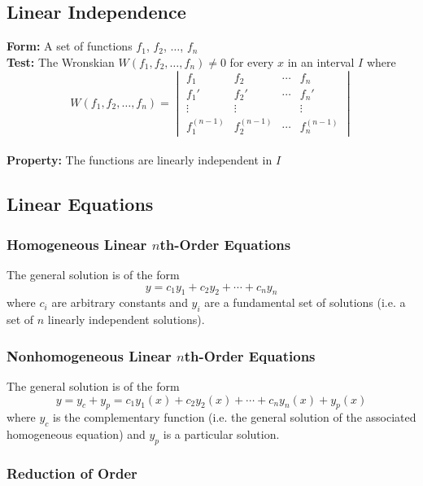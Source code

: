 \documentclass{article}
\begin{document}
\subsection{Linear Independence}

\textbf{Form:} A set of functions $f_1$, $f_2$, $\ldots$, $f_n$ \\ \textbf{Test:} The Wronskian $W(f_1, f_2, \ldots, f_n) \ne 0$ for every $x$ in an interval $I$ where \[W(f_1, f_2, \ldots, f_n) = \begin{vmatrix}
    f_1           & f_2           & \cdots & f_n           \\
    f_1'          & f_2'          & \cdots & f_n'          \\
    \vdots        & \vdots        &        & \vdots        \\
    f_1^{(n - 1)} & f_2^{(n - 1)} & \cdots & f_n^{(n - 1)}
  \end{vmatrix}\] \\ \textbf{Property:} The functions are linearly independent in $I$

\subsection{Linear Equations}

\subsubsection{Homogeneous Linear $n$th-Order Equations}

The general solution is of the form \[y = c_1 y_1 + c_2 y_2 + \cdots + c_n y_n\] where $c_i$ are arbitrary constants and $y_i$ are a fundamental set of solutions (i.e. a set of $n$ linearly independent solutions).

\subsubsection{Nonhomogeneous Linear $n$th-Order Equations}

The general solution is of the form \[y = y_c + y_p = c_1 y_1(x) + c_2 y_2(x) + \cdots + c_n y_n(x) + y_p(x)\] where $y_c$ is the complementary function (i.e. the general solution of the associated homogeneous equation) and $y_p$ is a particular solution.

\subsubsection{Reduction of Order}
\end{document}
